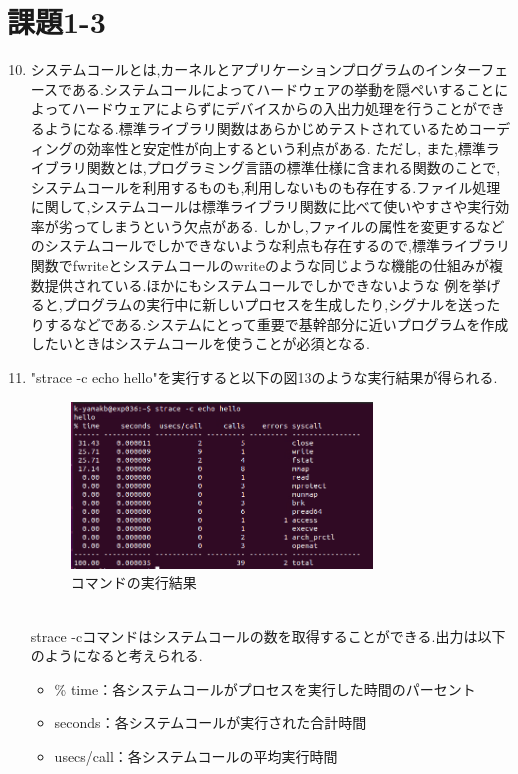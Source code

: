 \documentclass[dvipdfmx]{jarticle}
\begin{document}
\section{課題1-3}
\begin{enumerate}
\setcounter{enumi}{9}
    \item システムコールとは,カーネルとアプリケーションプログラムのインターフェースである.システムコールによってハードウェアの挙動を隠ぺいすることによってハードウェアによらずにデバイスからの入出力処理を行うことができるようになる.標準ライブラリ関数はあらかじめテストされているためコーディングの効率性と安定性が向上するという利点がある.
    ただし,
    また,標準ライブラリ関数とは,プログラミング言語の標準仕様に含まれる関数のことで,システムコールを利用するものも,利用しないものも存在する.ファイル処理に関して,システムコールは標準ライブラリ関数に比べて使いやすさや実行効率が劣ってしまうという欠点がある.
    しかし,ファイルの属性を変更するなどのシステムコールでしかできないような利点も存在するので,標準ライブラリ関数でfwriteとシステムコールのwriteのような同じような機能の仕組みが複数提供されている.ほかにもシステムコールでしかできないような
    例を挙げると,プログラムの実行中に新しいプロセスを生成したり,シグナルを送ったりするなどである.システムにとって重要で基幹部分に近いプログラムを作成したいときはシステムコールを使うことが必須となる.
    \item "strace -c echo hello"を実行すると以下の図13のような実行結果が得られる.
    \begin{figure}[h]
        \centering
        \includegraphics[width=8cm]{1-3-11.png}
        \caption{コマンドの実行結果}
    \end{figure}
    \\strace -cコマンドはシステムコールの数を取得することができる.出力は以下のようになると考えられる.
    \begin{itemize}
        \item \% time：各システムコールがプロセスを実行した時間のパーセント
        \item seconds：各システムコールが実行された合計時間
        \item usecs/call：各システムコールの平均実行時間

\end{itemize}
\end{enumerate}
\end{document}
